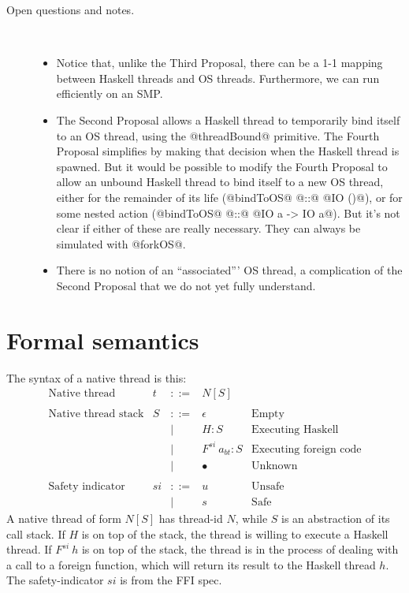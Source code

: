 \documentclass{article}
\newcommand{\hcall}{H}
\newcommand{\fcall}[2]{F^{#1}~#2}
\begin{document}
\begin{description}
\item[Open questions and notes.] \mbox{}\\
\begin{itemize}
\item Notice that, unlike the Third Proposal, there can be a 1-1 mapping between Haskell threads
and OS threads.  Furthermore, we can run efficiently on an SMP.

\item The Second Proposal allows a Haskell thread to temporarily bind itself to an OS thread, using the
@threadBound@ primitive.  The Fourth Proposal simplifies by making that decision when the Haskell
thread is spawned.  But it would be possible to modify the Fourth Proposal to allow an unbound Haskell
thread to bind itself to a new OS thread, either for the remainder of its life (@bindToOS@ @::@ @IO ()@),
or for some nested action (@bindToOS@ @::@ @IO a -> IO a@).  But it's not clear if either of these are really
necessary.  They can always be simulated with @forkOS@.

\item There is no notion of an ``associated''' OS thread, a complication of the Second Proposal that we
do not yet fully understand.
\end{itemize}
\end{description}


\section{Formal semantics}

The syntax of a native thread is this:
$$
\begin{array}{lrcll}
\mbox{Native thread} &  t & ::= & N[S] \\
\\
\mbox{Native thread stack} &  S & ::= & \epsilon & \mbox{Empty}\\
        & & | & \hcall : S  & \mbox{Executing Haskell} \\
        & & | & \fcall{si}{a_{bt}} : S & \mbox{Executing foreign code} \\
        & & | & \bullet & \mbox{Unknown}\\
\\
\mbox{Safety indicator} &  si & ::= & u & \mbox{Unsafe} \\
        & & | & s & \mbox{Safe}
\end{array}
$$
A native thread of form $N[S]$ has thread-id $N$, while $S$ is
an abstraction of its call stack.  If $\hcall$ is on top of the stack,
the thread is willing to execute a Haskell thread. 
If $\fcall{si}{h}$ is
on top of the stack, the thread is in the process of dealing with a call
to a foreign function, which will return its result to the Haskell thread
$h$.  The safety-indicator $si$ is from the FFI spec.
\end{document}
